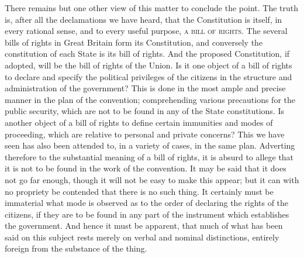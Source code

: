 There remains but one other view of this matter to conclude the point. 
The truth is, after all the declamations we have heard, that the Constitution is itself, in every rational sense, and to every useful purpose, \textsc{a bill of rights}. 
The several bills of rights in Great Britain form its Constitution, and conversely the constitution of each State is its bill of rights. 
And the proposed Constitution, if adopted, will be the bill of rights of the Union. 
Is it one object of a bill of rights to declare and specify the political privileges of the citizens in the structure and administration of the government? 
This is done in the most ample and precise manner in the plan of the convention; comprehending various precautions for the public security, which are not to be found in any of the State constitutions. 
Is another object of a bill of rights to define certain immunities and modes of proceeding, which are relative to personal and private concerns? 
This we have seen has also been attended to, in a variety of cases, in the same plan. 
Adverting therefore to the substantial meaning of a bill of rights, it is absurd to allege that it is not to be found in the work of the convention. 
It may be said that it does not go far enough, though it will not be easy to make this appear; but it can with no propriety be contended that there is no such thing. 
It certainly must be immaterial what mode is observed as to the order of declaring the rights of the citizens, if they are to be found in any part of the instrument which establishes the government. 
And hence it must be apparent, that much of what has been said on this subject rests merely on verbal and nominal distinctions, entirely foreign from the substance of the thing.

